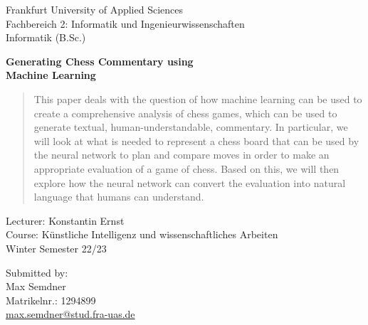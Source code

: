 \begin{titlepage}
\begin{flushleft}
Frankfurt University of Applied Sciences\\
Fachbereich 2: Informatik und Ingenieurwissenschaften\\
Informatik (B.Sc.)\\
\end{flushleft}

\vspace{3.5cm}

\begin{center}
\Large
\textbf{Generating Chess Commentary using\\Machine Learning}\\
\end{center}

\begin{abstract}
This paper deals with the question of how machine learning can be used to create a comprehensive analysis of chess games, which can be used to generate textual, human-understandable, commentary. In particular, we will look at what is needed to represent a chess board that can be used by the neural network to plan and compare moves in order to make an appropriate evaluation of a game of chess. Based on this, we will then explore how the neural network can convert the evaluation into natural language that humans can understand.
\end{abstract}

\vspace{6cm}
	
\begin{flushright}
Lecturer: Konstantin Ernst\\
Course: Künstliche Intelligenz und wissenschaftliches Arbeiten\\
Winter Semester 22/23\\
\end{flushright}

\vspace{2cm}

\begin{flushleft}
Submitted by:\\
Max Semdner\\
Matrikelnr.: 1294899\\
\href{mailto: max.semdner@stud.fra-uas.de}{max.semdner@stud.fra-uas.de}\\
\end{flushleft}

\end{titlepage}